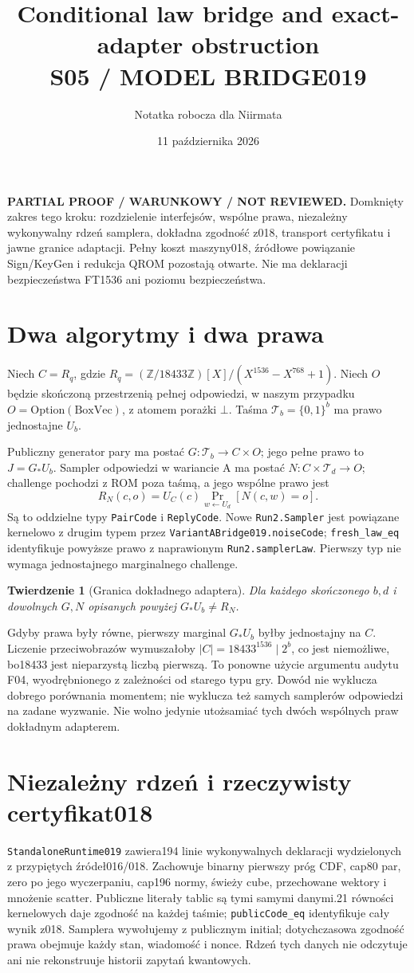 \documentclass[11pt,a4paper]{article}
\title{Conditional law bridge and exact-adapter obstruction\\\large S05 / MODEL BRIDGE019}
\author{Notatka robocza dla Niirmata}\date{11 października 2026}
\newcommand{\code}[1]{\nolinkurl{#1}}
\newtheorem{theorem}{Twierdzenie}
\begin{document}
\maketitle
\textbf{PARTIAL PROOF / WARUNKOWY / NOT REVIEWED.}
Domknięty zakres tego kroku: rozdzielenie interfejsów, wspólne prawa,
niezależny wykonywalny rdzeń samplera, dokładna zgodność z018, transport
certyfikatu i jawne granice adaptacji. Pełny koszt maszyny018, źródłowe
powiązanie Sign/KeyGen i redukcja QROM pozostają otwarte.
Nie ma deklaracji bezpieczeństwa FT1536 ani poziomu bezpieczeństwa.

\section{Dwa algorytmy i dwa prawa}
Niech $C=R_q$, gdzie
$R_q=(\mathbb Z/18433\mathbb Z)[X]/(X^{1536}-X^{768}+1)$.
Niech $O$ będzie skończoną przestrzenią pełnej odpowiedzi, w naszym
przypadku $O=\mathrm{Option}(\mathrm{BoxVec})$, z atomem porażki $\bot$.
Taśma $\mathcal T_b=\{0,1\}^b$ ma prawo jednostajne $U_b$.

Publiczny generator pary ma postać $G:\mathcal T_b\to C\times O$;
jego pełne prawo to $J=G_*U_b$. Sampler odpowiedzi w wariancie A ma
postać $N:C\times\mathcal T_d\to O$; challenge pochodzi z ROM poza
taśmą, a jego wspólne prawo jest
\[
 R_N(c,o)=U_C(c)\Pr_{w\gets U_d}[N(c,w)=o].
\]
Są to oddzielne typy \code{PairCode} i \code{ReplyCode}. Nowe
\code{Run2.Sampler} jest powiązane kernelowo z drugim typem przez
\code{VariantABridge019.noiseCode}; \code{fresh_law_eq} identyfikuje
powyższe prawo z naprawionym \code{Run2.samplerLaw}.
Pierwszy typ nie wymaga jednostajnego marginalnego challenge.

\begin{theorem}[Granica dokładnego adaptera]
Dla każdego skończonego $b,d$ i dowolnych $G,N$ opisanych powyżej
$G_*U_b\ne R_N$.
\end{theorem}
Gdyby prawa były równe, pierwszy marginal $G_*U_b$ byłby jednostajny
na $C$. Liczenie przeciwobrazów wymuszałoby
$|C|=18433^{1536}\mid2^b$, co jest niemożliwe, bo18433 jest nieparzystą
liczbą pierwszą. To ponowne użycie argumentu audytu F04, wyodrębnionego
z zależności od starego typu gry. Dowód nie wyklucza dobrego porównania
momentem; nie wyklucza też samych samplerów odpowiedzi na zadane wyzwanie.
Nie wolno jedynie utożsamiać tych dwóch wspólnych praw dokładnym adapterem.

\section{Niezależny rdzeń i rzeczywisty certyfikat018}
\code{StandaloneRuntime019} zawiera194 linie wykonywalnych deklaracji
wydzielonych z przypiętych źródeł016/018. Zachowuje binarny pierwszy próg
CDF, cap80 par, zero po jego wyczerpaniu, cap196 normy, świeży cube,
przechowane wektory i mnożenie scatter. Publiczne literały tablic są tymi
samymi danymi.21 równości kernelowych daje zgodność na każdej taśmie;
\code{publicCode_eq} identyfikuje cały wynik z018.
Samplera wywołujemy z publicznym initial; dotychczasowa zgodność prawa
obejmuje każdy stan, wiadomość i nonce. Rdzeń tych danych nie odczytuje
ani nie rekonstruuje historii zapytań kwantowych.
\end{document}
